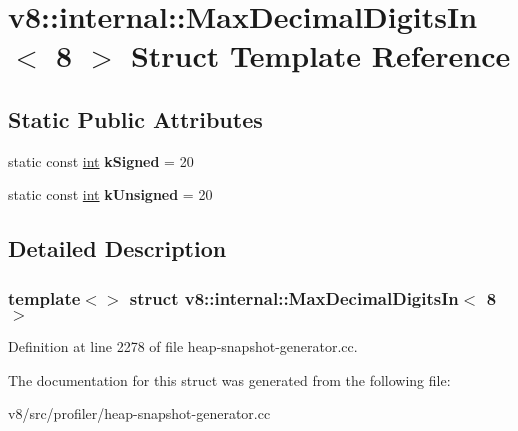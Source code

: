\hypertarget{structv8_1_1internal_1_1MaxDecimalDigitsIn_3_018_01_4}{}\section{v8\+:\+:internal\+:\+:Max\+Decimal\+Digits\+In$<$ 8 $>$ Struct Template Reference}
\label{structv8_1_1internal_1_1MaxDecimalDigitsIn_3_018_01_4}
\subsection*{Static Public Attributes}
\begin{DoxyCompactItemize}
\item 
\mbox{\label{structv8_1_1internal_1_1MaxDecimalDigitsIn_3_018_01_4_a5d49496214ab42e45bffd9981e9aab1b}} 
static const \mbox{\hyperlink{classint}{int}} {\bfseries k\+Signed} = 20
\item 
\mbox{\label{structv8_1_1internal_1_1MaxDecimalDigitsIn_3_018_01_4_a638181a897d317a42625ed1dfcba1090}} 
static const \mbox{\hyperlink{classint}{int}} {\bfseries k\+Unsigned} = 20
\end{DoxyCompactItemize}


\subsection{Detailed Description}
\subsubsection*{template$<$$>$\newline
struct v8\+::internal\+::\+Max\+Decimal\+Digits\+In$<$ 8 $>$}



Definition at line 2278 of file heap-\/snapshot-\/generator.\+cc.



The documentation for this struct was generated from the following file\+:\begin{DoxyCompactItemize}
\item 
v8/src/profiler/heap-\/snapshot-\/generator.\+cc\end{DoxyCompactItemize}
